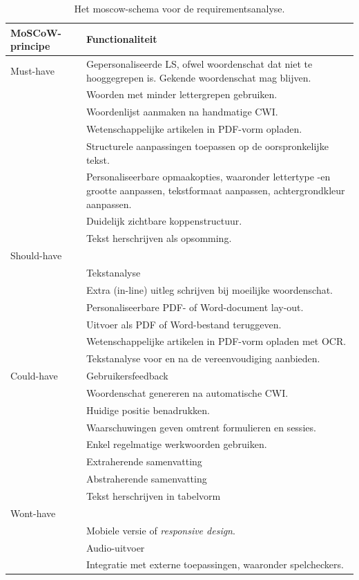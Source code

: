 \begin{center}
	\begin{table}[H]
		\begin{tabular}{ | m{4cm} | m{11cm} | } 
			\hline
			\textbf{MoSCoW-principe} & \textbf{Functionaliteit} \\
			\hline
			Must-have & Gepersonaliseerde LS, ofwel woordenschat dat niet te hooggegrepen is. Gekende woordenschat mag blijven. \\
			& Woorden met minder lettergrepen gebruiken. \\
			& Woordenlijst aanmaken na handmatige CWI. \\
			& Wetenschappelijke artikelen in PDF-vorm opladen. \\
			& Structurele aanpassingen toepassen op de oorspronkelijke tekst. \\
			& Personaliseerbare opmaakopties, waaronder lettertype -en grootte aanpassen, tekstformaat aanpassen, achtergrondkleur aanpassen. \\
			& Duidelijk zichtbare koppenstructuur. \\
			& Tekst herschrijven als opsomming. \\
			\hline
			Should-have & \\
			& Tekstanalyse \\
			& Extra (in-line) uitleg schrijven bij moeilijke woordenschat. \\
			& Personaliseerbare PDF- of Word-document lay-out. \\
			& Uitvoer als PDF of Word-bestand teruggeven. \\
			& Wetenschappelijke artikelen in PDF-vorm opladen met OCR. \\
			& Tekstanalyse voor en na de vereenvoudiging aanbieden. \\
			\hline
			Could-have 
			& Gebruikersfeedback \\
			& Woordenschat genereren na automatische CWI. \\
			& Huidige positie benadrukken. \\
			& Waarschuwingen geven omtrent formulieren en sessies. \\
			& Enkel regelmatige werkwoorden gebruiken. \\
			& Extraherende samenvatting \\
			& Abstraherende samenvatting \\
			& Tekst herschrijven in tabelvorm \\
			\hline
			Wont-have & \\
			& Mobiele versie of \textit{responsive design}. \\
			& Audio-uitvoer \\
			& Integratie met externe toepassingen, waaronder spelcheckers. \\
			\hline
		\end{tabular}
		\caption{Het moscow-schema voor de requirementsanalyse.}
		\label{img:moscow-table}
	\end{table}
\end{center}

